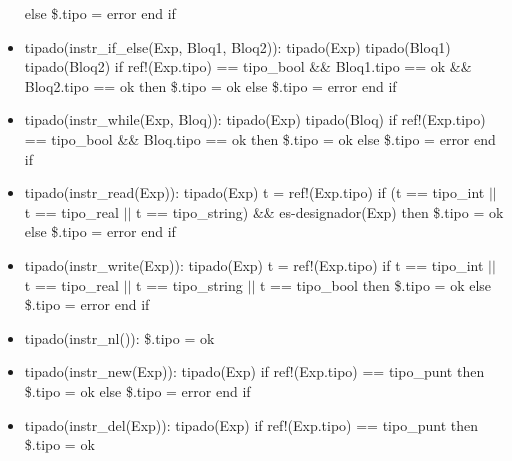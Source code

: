 \documentclass[11pt]{article}
\begin{document}
\begin{itemize}
                \subitem else
                    \subsubitem \$.tipo = error
                \subitem end if
            \item tipado(instr\_if\_else(Exp, Bloq1, Bloq2)): 
                \subitem tipado(Exp)
                \subitem tipado(Bloq1)
                \subitem tipado(Bloq2)
                \subitem if ref!(Exp.tipo) == tipo\_bool \&\&  Bloq1.tipo == ok \&\&  Bloq2.tipo == ok then
                    \subsubitem \$.tipo = ok
                \subitem else
                    \subsubitem \$.tipo = error
                \subitem end if
            \item tipado(instr\_while(Exp, Bloq)): 
                \subitem tipado(Exp)
                \subitem tipado(Bloq)
                \subitem if ref!(Exp.tipo) == tipo\_bool \&\&  Bloq.tipo == ok then
                    \subsubitem \$.tipo = ok
                \subitem else
                    \subsubitem \$.tipo = error
                \subitem end if
            \item tipado(instr\_read(Exp)): 
                \subitem tipado(Exp)
                \subitem t = ref!(Exp.tipo)
                \subitem if (t == tipo\_int $\vert \vert$ t == tipo\_real $\vert \vert$ t == tipo\_string) \&\&  es-designador(Exp) then
                    \subsubitem \$.tipo = ok
                \subitem else
                    \subsubitem \$.tipo = error
                \subitem end if
            \item tipado(instr\_write(Exp)): 
                \subitem tipado(Exp)
                \subitem t = ref!(Exp.tipo)
                \subitem if t == tipo\_int $\vert \vert$ t == tipo\_real $\vert \vert$ t == tipo\_string $\vert \vert$ t == tipo\_bool then
                    \subsubitem \$.tipo = ok
                \subitem else
                    \subsubitem \$.tipo = error
                \subitem end if
            \item tipado(instr\_nl()): 
                \subitem \$.tipo = ok
            \item tipado(instr\_new(Exp)): 
                \subitem tipado(Exp)
                \subitem if ref!(Exp.tipo) == tipo\_punt then
                    \subsubitem \$.tipo = ok
                \subitem else
                    \subsubitem \$.tipo = error
                \subitem end if
            \item tipado(instr\_del(Exp)): 
                \subitem tipado(Exp)
                \subitem if ref!(Exp.tipo) == tipo\_punt then
                    \subsubitem \$.tipo = ok

\end{itemize}
\end{document}
